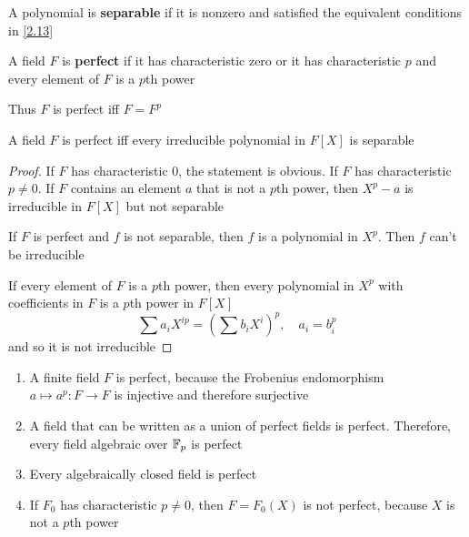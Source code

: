\documentclass[11pt]{article}
\begin{document}
\begin{definition}[]
A polynomial is \textbf{separable} if it is nonzero and satisfied the equivalent conditions in \ref{2.13}
\end{definition}

\begin{definition}[]
A field \(F\) is \textbf{perfect} if it has characteristic zero  or it has characteristic \(p\) and every
element of \(F\) is a \(p\)th power
\end{definition}

Thus \(F\) is perfect iff \(F=F^p\)

\begin{proposition}[]
A field \(F\) is perfect iff every irreducible polynomial in \(F[X]\) is separable
\end{proposition}

\begin{proof}
If \(F\) has characteristic 0, the statement is obvious. If \(F\) has characteristic \(p\neq 0\).
If \(F\) contains an element \(a\) that is not a \(p\)th power, then \(X^p-a\) is irreducible
in \(F[X]\) but not separable

If \(F\) is perfect and \(f\) is not separable, then \(f\) is a polynomial in \(X^p\). Then \(f\)
can't be irreducible

If every element of \(F\) is a \(p\)th power, then every polynomial in \(X^p\) with coefficients
in \(F\) is a \(p\)th power in \(F[X]\)
\begin{equation*}
\sum a_iX^{ip}=(\sum b_iX^i)^p,\quad a_i=b_i^p
\end{equation*}
and so it is not irreducible
\end{proof}

\begin{examplle}[]
\label{Problem1}
\begin{enumerate}
\item A finite field \(F\) is perfect, because the Frobenius endomorphism \(a\mapsto a^p:F\to F\) is
injective and therefore surjective
\item A field that can be written as a union of perfect fields is perfect. Therefore, every field
algebraic over \(\mathbb{F}_p\) is perfect
\item Every algebraically closed field is perfect
\item If \(F_0\) has characteristic \(p\neq 0\), then \(F=F_0(X)\) is not perfect, because \(X\) is
not a \(p\)th power
\end{enumerate}
\end{examplle}
\end{document}
